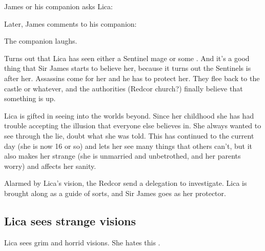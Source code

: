 James or his companion asks Lica: 


Later, James comments to his companion: 

The companion laughs. 

Turns out that Lica has seen either a Sentinel mage or some \daemon. 
And it's a good thing that Sir James starts to believe her, because it turns out the Sentinels is after her. Assassins come for her and he has to protect her. They flee back to the castle or whatever, and the authorities (Redcor church?) finally believe that something is up. 

Lica is gifted in seeing into the worlds beyond. Since her childhood she has had trouble accepting the illusion that everyone else believes in. She always wanted to see through the lie, doubt what she was told. This has continued to the current day (she is now 16 or so) and lets her see many things that others can't, but it also makes her strange (she is unmarried and unbetrothed, and her parents worry) and affects her sanity. 

Alarmed by Lica's vision, the Redcor send a delegation to investigate. Lica is brought along as a guide of sorts, and Sir James goes as her protector. 









\subsection{Lica sees strange visions}
Lica sees grim and horrid visions. 
She hates this . 










